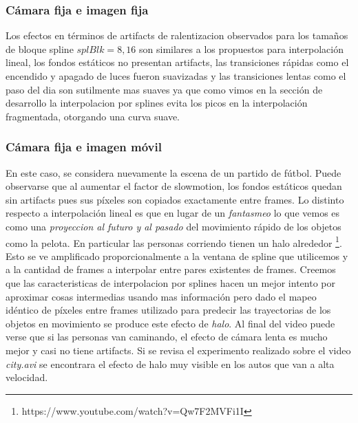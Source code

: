 \subsubsection*{Cámara fija e imagen fija}
Los efectos en términos de artifacts de ralentizacion observados para los tamaños de bloque spline $splBlk = 8, 16$ son similares a los propuestos para interpolación lineal, los fondos estáticos no presentan artifacts, las transiciones rápidas como el encendido y apagado de luces fueron suavizadas y las transiciones lentas como el paso del dia son sutilmente mas suaves ya que como vimos en la sección de desarrollo la interpolacion por splines evita los picos en la interpolación fragmentada, otorgando una curva suave.

\subsubsection*{Cámara fija e imagen móvil}
En este caso, se considera nuevamente la escena de un partido de fútbol. Puede observarse que al aumentar el factor de slowmotion, los fondos estáticos quedan sin artifacts pues sus píxeles son copiados exactamente entre frames. Lo distinto respecto a interpolación lineal es que en lugar de un \emph{fantasmeo} lo que vemos es como una \emph{proyeccion al futuro y al pasado} del movimiento rápido de los objetos como la pelota. En particular las personas corriendo tienen un halo alrededor \footnote{https://www.youtube.com/watch?v=Qw7F2MVFi1I}. Esto se ve amplificado proporcionalmente a la ventana de spline que utilicemos y a la cantidad de frames a interpolar entre pares existentes de frames. Creemos que las caracteristicas de interpolacion por splines hacen un mejor intento por aproximar cosas intermedias usando mas información pero dado el mapeo idéntico de píxeles entre frames utilizado para predecir las trayectorias de los objetos en movimiento se produce este efecto de \emph{halo}. Al final del video puede verse que si las personas van caminando, el efecto de cámara lenta es mucho mejor y casi no tiene artifacts.
Si se revisa el experimento realizado sobre el video \emph{city.avi} se encontrara el efecto de halo muy visible en los autos que van a alta velocidad. 

